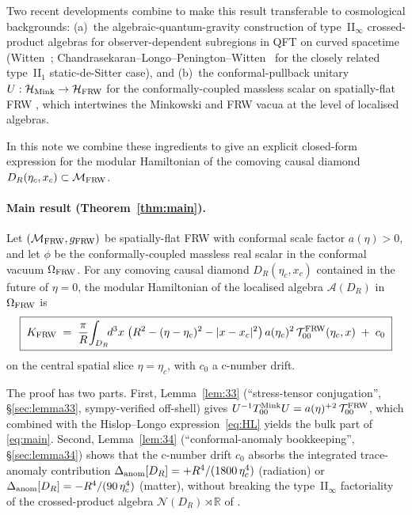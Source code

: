 \documentclass[11pt,a4paper]{article}
\theoremstyle{remark}
\newcommand{\FRW}{{\rm FRW}}
\newcommand{\Mink}{{\rm Mink}}
\newcommand{\Tt}{\mathcal{T}}
\newcommand{\R}{\mathbb{R}}
\newcommand{\N}{\mathcal{N}}
\begin{document}
Two recent developments combine to make this result transferable to
cosmological backgrounds: (a)~the algebraic-quantum-gravity construction
of type~II$_\infty$ crossed-product algebras for observer-dependent
subregions in QFT on curved spacetime (Witten~\cite{Witten2022};
Chandrasekaran--Longo--Penington--Witten~\cite{CLPW2022} for the closely
related type~II$_1$ static-de-Sitter case), and (b)~the conformal-pullback
unitary $U:\mathcal H_{\Mink}\to\mathcal H_{\FRW}$ for the
conformally-coupled massless scalar on spatially-flat FRW
\cite{Frob2023}, which intertwines the Minkowski and FRW vacua at the
level of localised algebras.

In this note we combine these ingredients to give an explicit closed-form
expression for the modular Hamiltonian of the comoving causal diamond
$D_R(\eta_c, x_c)\subset\mathcal M_{\FRW}$.

\paragraph{Main result (Theorem~\ref{thm:main}).}
Let $(\mathcal M_{\FRW},g_{\FRW})$ be spatially-flat FRW with conformal
scale factor $a(\eta)>0$, and let $\phi$ be the conformally-coupled
massless real scalar in the conformal vacuum $\Omega_{\FRW}$. For any
comoving causal diamond $D_R(\eta_c,x_c)$ contained in the future
of $\eta=0$, the modular Hamiltonian of the localised algebra
$\mathcal A(D_R)$ in $\Omega_{\FRW}$ is
\begin{equation}
\boxed{\;
  K_{\FRW}\;=\;\frac{\pi}{R}\!\int_{D_R}\!\!d^{3}x\;
    \bigl(R^{2}-(\eta-\eta_c)^{2}-|x-x_c|^{2}\bigr)\,
    a(\eta_c)^{2}\,\Tt_{00}^{\FRW}(\eta_c,x)\;+\;c_0\;}
\label{eq:main}
\end{equation}
on the central spatial slice $\eta=\eta_c$, with $c_0$ a c-number drift.
\medskip

The proof has two parts. First, Lemma~\ref{lem:33}
(``stress-tensor conjugation'', \S\ref{sec:lemma33}, sympy-verified
off-shell) gives
$U^{-1} T_{00}^{\Mink}U = a(\eta)^{+2}\,\Tt_{00}^{\FRW}$, which combined
with the Hislop--Longo expression~\eqref{eq:HL} yields the bulk part of
\eqref{eq:main}. Second, Lemma~\ref{lem:34} (``conformal-anomaly
bookkeeping'', \S\ref{sec:lemma34}) shows that the c-number drift $c_0$
absorbs the integrated trace-anomaly contribution
$\Delta_{\rm anom}[D_R] = +R^{4}/(1800\,\eta_c^{4})$ (radiation) or
$\Delta_{\rm anom}[D_R] = -R^{4}/(90\,\eta_c^{4})$ (matter), without breaking the
type~II$_\infty$ factoriality of the crossed-product algebra
$\N(D_R)\rtimes\R$ of \cite{Witten2022}.
\end{document}
